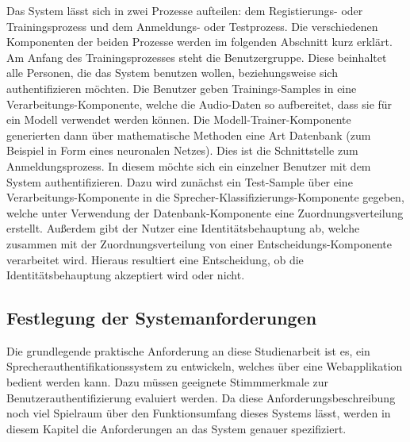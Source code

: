 Das System lässt sich in zwei Prozesse aufteilen: dem Registierungs- oder Trainingsprozess und dem Anmeldungs- oder Testprozess.
Die verschiedenen Komponenten der beiden Prozesse werden im folgenden Abschnitt kurz erklärt.
Am Anfang des Trainingsprozesses steht die Benutzergruppe.
Diese beinhaltet alle Personen, die das System benutzen wollen, beziehungsweise sich authentifizieren möchten.
Die Benutzer geben Trainings-Samples in eine Verarbeitungs-Komponente, welche die Audio-Daten so aufbereitet, dass sie für ein Modell verwendet werden können.
Die Modell-Trainer-Komponente generierten dann über mathematische Methoden eine Art Datenbank (zum Beispiel in Form eines neuronalen Netzes).
Dies ist die Schnittstelle zum Anmeldungsprozess.
In diesem möchte sich ein einzelner Benutzer mit dem System authentifizieren.
Dazu wird zunächst ein Test-Sample über eine Verarbeitungs-Komponente in die Sprecher-Klassifizierungs-Komponente gegeben, welche unter Verwendung der Datenbank-Komponente eine Zuordnungsverteilung erstellt.
Außerdem gibt der Nutzer eine Identitätsbehauptung ab, welche zusammen mit der Zuordnungsverteilung von einer Entscheidungs-Komponente verarbeitet wird.
Hieraus resultiert eine Entscheidung, ob die Identitätsbehauptung akzeptiert wird oder nicht.

\subsection{Festlegung der Systemanforderungen}\label{sec:anforderungen}

Die grundlegende praktische Anforderung an diese Studienarbeit ist es, ein Sprecherauthentifikationssystem zu entwickeln, welches über eine Webapplikation bedient werden kann.
Dazu müssen geeignete Stimmmerkmale zur Benutzerauthentifizierung evaluiert werden.
Da diese Anforderungsbeschreibung noch viel Spielraum über den Funktionsumfang dieses Systems lässt, werden in diesem Kapitel die Anforderungen an das System genauer spezifiziert.


